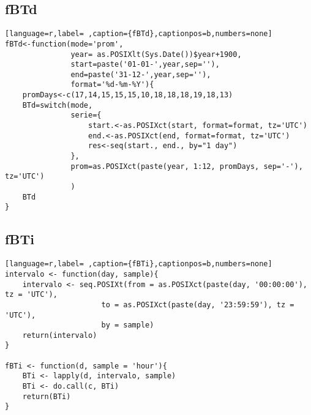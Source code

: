 \subsection{fBTd}
\label{sec:org4a4e4e6}
\label{subsec:fbtd}
\begin{lstlisting}[language=r,label= ,caption={fBTd},captionpos=b,numbers=none]
fBTd<-function(mode='prom',
               year= as.POSIXlt(Sys.Date())$year+1900,
               start=paste('01-01-',year,sep=''),
               end=paste('31-12-',year,sep=''), 
               format='%d-%m-%Y'){
    promDays<-c(17,14,15,15,15,10,18,18,18,19,18,13)
    BTd=switch(mode,
               serie={
                   start.<-as.POSIXct(start, format=format, tz='UTC')
                   end.<-as.POSIXct(end, format=format, tz='UTC')
                   res<-seq(start., end., by="1 day")
               },
               prom=as.POSIXct(paste(year, 1:12, promDays, sep='-'), tz='UTC')
               )
    BTd
}
\end{lstlisting}
\subsection{fBTi}
\label{sec:orgbe063cd}
\label{subsec:fbti}
\begin{lstlisting}[language=r,label= ,caption={fBTi},captionpos=b,numbers=none]
intervalo <- function(day, sample){
    intervalo <- seq.POSIXt(from = as.POSIXct(paste(day, '00:00:00'), tz = 'UTC'),
                      to = as.POSIXct(paste(day, '23:59:59'), tz = 'UTC'),
                      by = sample)
    return(intervalo)
}

fBTi <- function(d, sample = 'hour'){
    BTi <- lapply(d, intervalo, sample)
    BTi <- do.call(c, BTi)
    return(BTi)
}
\end{lstlisting}
